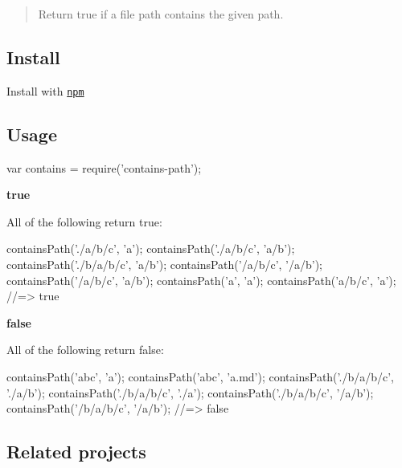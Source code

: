 \begin{quote}
Return true if a file path contains the given path. \end{quote}


\subsection*{Install}

Install with \href{https://www.npmjs.com/}{\tt npm}




\subsection*{Usage}


\begin{DoxyCode}
var contains = require('contains-path');
\end{DoxyCode}


{\bfseries true}

All of the following return {\ttfamily true}\+:


\begin{DoxyCode}
containsPath('./a/b/c', 'a');
containsPath('./a/b/c', 'a/b');
containsPath('./b/a/b/c', 'a/b');
containsPath('/a/b/c', '/a/b');
containsPath('/a/b/c', 'a/b');
containsPath('a', 'a');
containsPath('a/b/c', 'a');
//=> true
\end{DoxyCode}


{\bfseries false}

All of the following return {\ttfamily false}\+:


\begin{DoxyCode}
containsPath('abc', 'a');
containsPath('abc', 'a.md');
containsPath('./b/a/b/c', './a/b');
containsPath('./b/a/b/c', './a');
containsPath('./b/a/b/c', '/a/b');
containsPath('/b/a/b/c', '/a/b');
//=> false
\end{DoxyCode}


\subsection*{Related projects}


